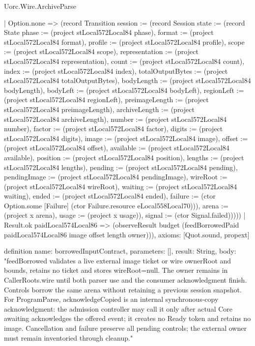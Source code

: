 \begin{lexlean}{Uorc.Wire.ArchiveParse}
\begin{semanticmodule}
{        | Option.none => (record Transition {session := (record Session {state := (record State {phase := (project stLocal572Local84 phase), format := (project stLocal572Local84 format), profile := (project stLocal572Local84 profile), scope := (project stLocal572Local84 scope), representation := (project stLocal572Local84 representation), count := (project stLocal572Local84 count), index := (project stLocal572Local84 index), totalOutputBytes := (project stLocal572Local84 totalOutputBytes), bodyLength := (project stLocal572Local84 bodyLength), bodyLeft := (project stLocal572Local84 bodyLeft), regionLeft := (project stLocal572Local84 regionLeft), preimageLength := (project stLocal572Local84 preimageLength), archiveLength := (project stLocal572Local84 archiveLength), number := (project stLocal572Local84 number), factor := (project stLocal572Local84 factor), digits := (project stLocal572Local84 digits), image := (project stLocal572Local84 image), offset := (project stLocal572Local84 offset), available := (project stLocal572Local84 available), position := (project stLocal572Local84 position), lengths := (project stLocal572Local84 lengths), pending := (project stLocal572Local84 pending), pendingImage := (project stLocal572Local84 pendingImage), wireRoot := (project stLocal572Local84 wireRoot), waiting := (project stLocal572Local84 waiting), ended := (project stLocal572Local84 ended), failure := (ctor Option.some [Failure] (ctor Failure.resource eLocal558Local70))}), arena := (project x arena), usage := (project x usage)}), signal := (ctor Signal.failed)}))))
    | Result.ok paidLocal574Local86 => (observeResult budget (feedBorrowedPaid paidLocal574Local86 image offset length owner))),
  axioms: [Quot.sound, propext]
}

definition{
  name: borrowedInputContract,
  parameters: [],
  result: String,
  body: "feedBorrowed validates a live external image ticket or wire ownerRoot and bounds, retains no ticket and stores wireRoot=null. The owner remains in CallerRoots.wire until both parser use and the consumer acknowledgment finish. Controls borrow the same arena without retaining a previous session snapshot. For ProgramParse, acknowledgeCopied is an internal synchronous-copy acknowledgment: the admission controller may call it only after actual Core awaiting acknowledges the offered event; it creates no Ready token and retains no image. Cancellation and failure preserve all pending controls; the external owner must remain inventoried through cleanup."
}
\end{semanticmodule}
\end{lexlean}
